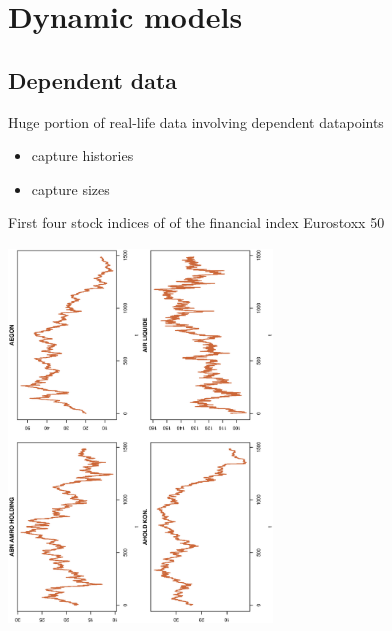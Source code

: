 \section{Dynamic models}
\begin{slide}
\tableofcontents[sectionstyle=show/hide,subsectionstyle=show/shaded/hide]

\end{slide}\subsection{Dependent data}\begin{slide}

Huge portion of real-life data involving dependent datapoints

\vs\pause
\begin{example}\begin{itemize}
\item capture histories
\item capture sizes
\end{itemize}\end{example}

\end{slide}\begin{slide}

First four stock indices of of the financial index
{\sf Eurostoxx 50}

\centerline{\includegraphics[height=10cm,angle=270,width=7cm]{figures/Euro.eps}}

\end{slide}\begin{slide}


\end{slide}
